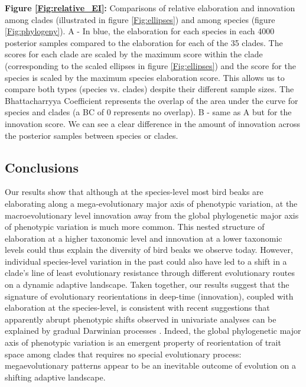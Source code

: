 \documentclass[12pt,letterpaper]{article}
\begin{document}
\bigskip

\noindent \textbf{Figure \ref{Fig:relative_EI}:} Comparisons of relative elaboration and innovation among clades (illustrated in figure  \ref{Fig:ellipses}) and among species (figure \ref{Fig:phylogeny}).
A - In blue, the elaboration for each species in each 4000 posterior samples compared to the elaboration for each of the 35 clades.
The scores for each clade are scaled by the maximum score within the clade (corresponding to the scaled ellipses in figure  \ref{Fig:ellipses}) and the score for the species is scaled by the maximum species elaboration score.
This allows us to compare both types (species vs. clades) despite their different sample sizes.
The Bhattacharryya Coefficient represents the overlap of the area under the curve for species and clades (a BC of 0 represents no overlap).
B - same as A but for the innovation score.
We can see a clear difference in the amount of innovation across the posterior samples between species or clades.


\subsection{Conclusions}

Our results show that although at the species-level most bird beaks are elaborating along a mega-evolutionary major axis of phenotypic variation, at the macroevolutionary level innovation away from the global phylogenetic major axis of phenotypic variation is much more common. 
This nested structure of elaboration at a higher taxonomic level and innovation at a lower taxonomic levels could thus explain the diversity of bird beaks we observe today.
However, individual species-level variation in the past could also have led to a shift in a clade's line of least evolutionary resistance through different evolutionary routes on a dynamic adaptive landscape. 
Taken together, our results suggest that the signature of evolutionary reorientations in deep-time (innovation), coupled with elaboration at the species-level, is consistent with recent suggestions that apparently abrupt phenotypic shifts observed in univariate analyses can be explained by gradual Darwinian processes \cite{pagel2022general}.
Indeed, the global phylogenetic major axis of phenotypic variation is an emergent property of reorientation of trait space among clades that requires no special evolutionary process: megaevolutionary patterns appear to be an inevitable outcome of evolution on a shifting adaptive landscape. 
\end{document}
